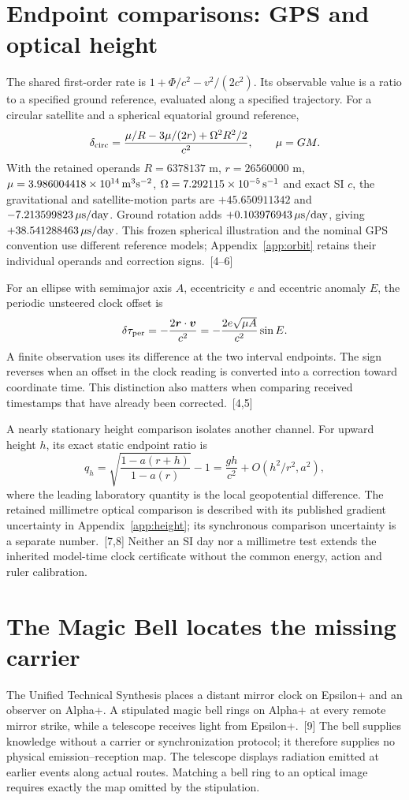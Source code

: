 \documentclass[10pt,twocolumn,letterpaper]{article}
\begin{document}
\section{Endpoint comparisons: GPS and optical height}
The shared first-order rate is $1+\Phi/c^2-v^2/(2c^2)$. Its observable value is a ratio to a specified ground reference, evaluated along a specified trajectory. For a circular satellite and a spherical equatorial ground reference,
\[
 \delta_{\rm circ}=\frac{\mu/R-3\mu/(2r)+\Omega^2R^2/2}{c^2},\qquad \mu=GM.
\]
With the retained operands $R=6378137$ m, $r=26560000$ m, $\mu=3.986004418\times 10^{14}\,{\rm m^3s^{-2}}$, $\Omega=7.292115\times 10^{-5}\,{\rm s^{-1}}$ and exact SI $c$, the gravitational and satellite-motion parts are $+45.650911342$ and $-7.213599823\,\mu{\rm s/day}$. Ground rotation adds $+0.103976943\,\mu{\rm s/day}$, giving $+38.541288463\,\mu{\rm s/day}$. This frozen spherical illustration and the nominal GPS convention use different reference models; Appendix~\ref{app:orbit} retains their individual operands and correction signs.~[4--6]

For an ellipse with semimajor axis $A$, eccentricity $e$ and eccentric anomaly $E$, the periodic unsteered clock offset is
\[
 \delta\tau_{\rm per}=-\frac{2\bm r\cdot\bm v}{c^2}
 =-\frac{2e\sqrt{\mu A}}{c^2}\sin E.
\]
A finite observation uses its difference at the two interval endpoints. The sign reverses when an offset in the clock reading is converted into a correction toward coordinate time. This distinction also matters when comparing received timestamps that have already been corrected.~[4,5]

A nearly stationary height comparison isolates another channel. For upward height $h$, its exact static endpoint ratio is
\[
 q_h=\sqrt{\frac{1-a(r+h)}{1-a(r)}}-1
      =\frac{gh}{c^2}+O(h^2/r^2,a^2),
\]
where the leading laboratory quantity is the local geopotential difference. The retained millimetre optical comparison is described with its published gradient uncertainty in Appendix~\ref{app:height}; its synchronous comparison uncertainty is a separate number.~[7,8] Neither an SI day nor a millimetre test extends the inherited model-time clock certificate without the common energy, action and ruler calibration.

\section{The Magic Bell locates the missing carrier}
The Unified Technical Synthesis places a distant mirror clock on Epsilon+ and an observer on Alpha+. A stipulated magic bell rings on Alpha+ at every remote mirror strike, while a telescope receives light from Epsilon+.~[9] The bell supplies knowledge without a carrier or synchronization protocol; it therefore supplies no physical emission--reception map. The telescope displays radiation emitted at earlier events along actual routes. Matching a bell ring to an optical image requires exactly the map omitted by the stipulation.
\end{document}

